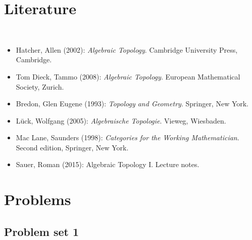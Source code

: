 \documentclass[11pt]{book}
\numberwithin{dummy}{section}
\theoremstyle{nonumberbreak}
\begin{document}
\begin{spacing}{1.4}
\chapter{Literature}


\thispagestyle{empty}


\textrm{ }\\[55pt]


\begin{itemize}
\item Hatcher, Allen (2002): \textit{Algebraic Topology}. Cambridge University Press, Cambridge.
\item Tom Dieck, Tammo (2008): \textit{Algebraic Topology}. European Mathematical Society, Zurich.
\item Bredon, Glen Eugene (1993): \textit{Topology and Geometry}. Springer, New York.
\item Lück, Wolfgang (2005): \textit{Algebraische Topologie}. Vieweg, Wiesbaden.
\item Mac Lane, Saunders (1998): \textit{Categories for the Working Mathematician}. Second edition, Springer, New York.
\item Sauer, Roman (2015): Algebraic Topology I. Lecture notes.



\end{itemize}



\newpage

\thispagestyle{empty}









\chapter{Problems} %

\setlength\abovedisplayshortskip{0pt}
\setlength\belowdisplayshortskip{10pt}
\setlength\abovedisplayskip{10pt}
\setlength\belowdisplayskip{10pt}

\thispagestyle{empty}
\setcounter{section}{0}





\titlespacing*{\section}{-16.5pt}{0pt}{20pt}
\renewcommand*\thesection{}
\section{Problem set 1} %
\renewcommand*\thesection{\arabic{section}}



\end{spacing}
\end{document}
